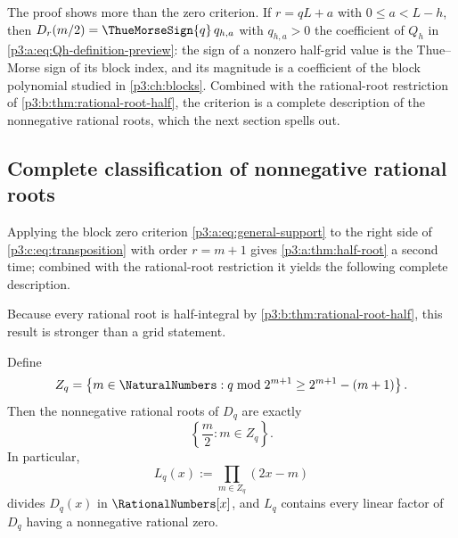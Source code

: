\documentclass[11pt,oneside]{article}
\numberwithin{equation}{section}
\theoremstyle{definition}
\theoremstyle{remark}
\begin{document}
\begin{remark}
The proof shows more than the zero criterion. If $r=qL+a$ with
$0\le a<L-h$, then $D_r(m/2)=\ThueMorseSign{q}\,q_{h,a}$ with $q_{h,a}>0$ the
coefficient of $Q_h$ in \eqref{p3:a:eq:Qh-definition-preview}: the sign of a
nonzero half-grid value is the Thue--Morse sign of its block index, and its
magnitude is a coefficient of the block polynomial studied in
\cref{p3:ch:blocks}. Combined with the rational-root restriction of
\cref{p3:b:thm:rational-root-half}, the criterion is a complete description of
the nonnegative rational roots, which the next section spells out.
\end{remark}

\subsection{Complete classification of nonnegative rational roots}

Applying the block zero criterion \cref{p3:a:eq:general-support} to the right side of \cref{p3:c:eq:transposition} with order \(r=m+1\) gives \cref{p3:a:thm:half-root} a second time; combined with the rational-root restriction it yields the following complete description.

Because every rational root is half-integral by
\cref{p3:b:thm:rational-root-half}, this result is stronger than a grid statement.

\begin{corollary}\label{p3:c:cor:all-nonneg-rational}
Define
\begin{equation}
 Z_q=\left\{m\in\NaturalNumbers:
 q\bmod2^{m+1}\geq2^{m+1}-(m+1)\right\}.                  \label{p3:c:eq:Zq}
\end{equation}
Then the nonnegative rational roots of \(D_q\) are exactly
\begin{equation}
 \left\{\frac m2:m\in Z_q\right\}.                        \label{p3:c:eq:nonneg-rational-roots}
\end{equation}
In particular,
\begin{equation}
 L_q(x):=\prod_{m\in Z_q}(2x-m)                            \label{p3:c:eq:Lq}
\end{equation}
divides \(D_q(x)\) in \(\RationalNumbers[x]\), and \(L_q\) contains every linear
factor of \(D_q\) having a nonnegative rational zero.
\end{corollary}
\end{document}
